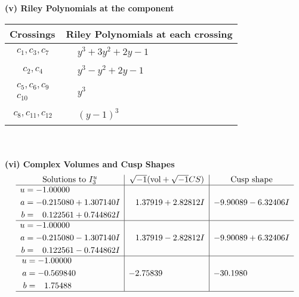 \documentclass[1p]{elsarticle_modified}
\theoremstyle{definition}
\newcommand{\I}{\sqrt{-1}}
\begin{document}
\newpage\renewcommand{\arraystretch}{1}
\flushleft \textbf{(v) Riley Polynomials at the component}\newline \\
\begin{tabular}{m{50pt}|m{274pt}}
Crossings & \hspace{64pt}Riley Polynomials at each crossing \\
\hline $$\begin{aligned}c_{1},c_{3},c_{7}\end{aligned}$$&$\begin{aligned}
&y^3+3 y^2+2 y-1
\end{aligned}$\\
\hline $$\begin{aligned}c_{2},c_{4}\end{aligned}$$&$\begin{aligned}
&y^3- y^2+2 y-1
\end{aligned}$\\
\hline $$\begin{aligned}c_{5},c_{6},c_{9}\\c_{10}\end{aligned}$$&$\begin{aligned}
&y^3
\end{aligned}$\\
\hline $$\begin{aligned}c_{8},c_{11},c_{12}\end{aligned}$$&$\begin{aligned}
&(y-1)^3
\end{aligned}$\\
\hline
\end{tabular}\\~\\
\newpage\flushleft \textbf{(vi) Complex Volumes and Cusp Shapes}
$$\begin{array}{c|c|c}  
\text{Solutions to }I^u_{3}& \I (\text{vol} + \sqrt{-1}CS) & \text{Cusp shape}\\
 \hline 
\begin{aligned}
u &= -1.00000\phantom{ +0.000000I} \\
a &= -0.215080 + 1.307140 I \\
b &= \phantom{-}0.122561 + 0.744862 I\end{aligned}
 & \phantom{-}1.37919 + 2.82812 I & -9.90089 - 6.32406 I \\ \hline\begin{aligned}
u &= -1.00000\phantom{ +0.000000I} \\
a &= -0.215080 - 1.307140 I \\
b &= \phantom{-}0.122561 - 0.744862 I\end{aligned}
 & \phantom{-}1.37919 - 2.82812 I & -9.90089 + 6.32406 I \\ \hline\begin{aligned}
u &= -1.00000\phantom{ +0.000000I} \\
a &= -0.569840\phantom{ +0.000000I} \\
b &= \phantom{-}1.75488\phantom{ +0.000000I}\end{aligned}
 & -2.75839\phantom{ +0.000000I} & -30.1980\phantom{ +0.000000I}\\
 \hline 
 \end{array}$$\newpage
\end{document}
